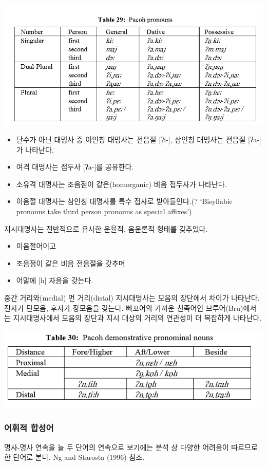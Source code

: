 \includegraphics{Pacoh/src/PacohTable29.png}

\begin{itemize}
\item 단수가 아닌 대명사 중 이인칭 대명사는 전음절 [ʔi-], 삼인칭 대명사는 전음절 [ʔa-]가 나타난다.
\item 여격 대명사는 접두사 [ʔa-]를 공유한다. 
\item 소유격 대명사는 조음점이 같은(homorganic) 비음 접두사가 나타난다.
\item 이음절 대명사는 삼인칭 대명사를 특수 접사로 받아들인다.(? `Bisyllabic pronouns take third person pronouns as special affixes')
\end{itemize}

지시대명사는 전반적으로 유사한 운율적, 음운론적 형태를 갖추었다.
\begin{itemize}
\item 이음절어이고
\item 조음점이 같은 비음 전음절을 갖추며
\item 어말에 [h] 자음을 갖는다.
\end{itemize}
중간 거리와(medial) 먼 거리(distal) 지시대명사는 모음의 장단에서 차이가 나타난다. 전자가 단모음, 후자가 장모음을 갖는다. 빠꼬어의 가까운 친족어인 브루어(Bru)에서는 지시대명사에서 모음의 장단과 지시 대상의 거리의 연관성이 더 복잡하게 나타난다.

\includegraphics{Pacoh/src/PacohTable30.png}

\subsubsection{어휘적 합성어}
명사-명사 연속을 늘 두 단어의 연속으로 보기에는 분석 상 다양한 어려움이 따르므로 한 단어로 본다. Ng and Starosta (1996) 참조.

